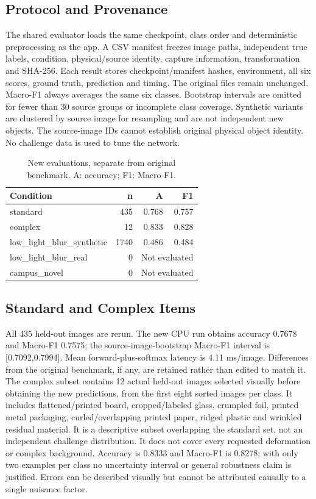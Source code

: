 \documentclass[conference]{IEEEtran}
\begin{document}
\subsection{Protocol and Provenance}
The shared evaluator loads the same checkpoint, class order and deterministic preprocessing as the app. A CSV manifest freezes image paths, independent true labels, condition, physical/source identity, capture information, transformation and SHA-256. Each result stores checkpoint/manifest hashes, environment, all six scores, ground truth, prediction and timing. The original files remain unchanged. Macro-F1 always averages the same six classes. Bootstrap intervals are omitted for fewer than 30 source groups or incomplete class coverage. Synthetic variants are clustered by source image for resampling and are not independent new objects. The source-image IDs cannot establish original physical object identity. No challenge data is used to tune the network.
\begin{table}[t]\centering\caption{New evaluations, separate from original benchmark. A: accuracy; F1: Macro-F1.}\label{tab:stress}
\scriptsize\begin{tabular}{lrrr}\hline Condition & n & A & F1\\\hline
standard & 435 & 0.768 & 0.757 \\
complex & 12 & 0.833 & 0.828 \\
low\_light\_blur\_synthetic & 1740 & 0.486 & 0.484 \\
low\_light\_blur\_real & 0 & \multicolumn{2}{c}{Not evaluated} \\
campus\_novel & 0 & \multicolumn{2}{c}{Not evaluated} \\
\hline\end{tabular}\end{table}

\subsection{Standard and Complex Items}
All 435 held-out images are rerun. The new CPU run obtains accuracy 0.7678 and Macro-F1 0.7575; the source-image-bootstrap Macro-F1 interval is [0.7092,0.7994]. Mean forward-plus-softmax latency is 4.11 ms/image. Differences from the original benchmark, if any, are retained rather than edited to match it.
The complex subset contains 12 actual held-out images selected visually before obtaining the new predictions, from the first eight sorted images per class. It includes flattened/printed board, cropped/labeled glass, crumpled foil, printed metal packaging, curled/overlapping printed paper, ridged plastic and wrinkled residual material. It is a descriptive subset overlapping the standard set, not an independent challenge distribution. It does not cover every requested deformation or complex background. Accuracy is 0.8333 and Macro-F1 is 0.8278; with only two examples per class no uncertainty interval or general robustness claim is justified. Errors can be described visually but cannot be attributed causally to a single nuisance factor.
\end{document}
